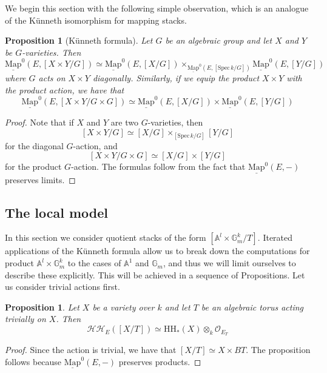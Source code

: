\documentclass[11pt,letterpaper]{amsart}
\newtheorem{proposition}[dummy]{Proposition}
\newcommand{\bA}{\mathbb{A}}
\newcommand{\bG}{\mathbb{G}}
\newcommand{\cO}{\mathcal{O}}
\newcommand{\cHH}{\mathcal{HH}}
\newcommand{\Mapo}[2]{\underline{\mathrm{Map}}^{0}\left (#1,#2\right )}
\newcommand{\Spec}{\mathrm{S}\mathrm{pec}\,}
\begin{document}
We begin this section with the following simple observation, which is an analogue of the K\"unneth isomorphism for mapping stacks. 
\begin{proposition}[K\"unneth formula]\label{remark:Kunneth}
Let $G$ be an algebraic group and let $X$ and $Y$ be $G$-varieties. Then  
\begin{equation*}
\Mapo{E}{[X\times Y/G]}\simeq\Mapo{E}{[X/G]}\times_{\Mapo{E}{[\Spec k/G]}}\Mapo{E}{[Y/G]}
\end{equation*}
where $G$ acts on $X\times Y$ diagonally. Similarly, if we equip the product $X\times Y$ with the product action, we have that
\begin{equation*}
\Mapo{E}{[X\times Y/G\times G]}\simeq\Mapo{E}{[X/G]}\times\Mapo{E}{[Y/G]}
\end{equation*}
\end{proposition}
\begin{proof}
Note that if $X$ and $Y$ are two $G$-varieties, then 
$$
[X\times Y/G]\simeq [X/G]\times_{[\Spec k/G]}[Y/G]
$$
for the diagonal $G$-action, and 
$$
[X\times Y/G\times G]\simeq [X/G]\times [Y/G]
$$
for the product $G$-action.
The formulas follow from the fact that $\Mapo{E}{-}$ preserves limits.
\end{proof}
 
 \subsection{The local model} 
In this section we consider quotient stacks of the form $[\mathbb{A}^l \times \mathbb{G}_m^{k}/T]$. 
Iterated applications of the K\"unneth formula allow us to break down the computations for product $\bA^l\times\bG_m^k$ to the cases of $\bA^1$ and $\bG_m$, and thus we will limit ourselves to describe these explicitly. This will be achieved in a sequence of Propositions. 
Let us  consider trivial actions first.
\begin{proposition}
Let $X$ be a variety over $k$ and let $T$ be an algebraic torus acting trivially on $X$. Then 
\begin{equation*}
\cHH_E([X/T]) \simeq \mathrm{HH}_\ast(X)\otimes_{k}\cO_{E_T}
\end{equation*}
\end{proposition}
\begin{proof}
Since the action is trivial, we have that $[X/T]\simeq X\times BT$. The proposition follows because   $\Mapo{E}{-}$ preserves products. \end{proof}
 
\end{document}
